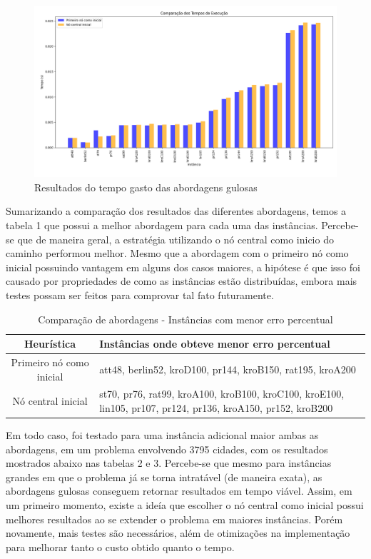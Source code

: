 \documentclass[10pt]{extarticle} %
\begin{document}
\begin{figure}[H]
    \centering
    \includegraphics[width=1\linewidth]{graficos_tempo.png}
    \caption{Resultados do tempo gasto das abordagens gulosas}
    \label{fig:Resultados abordagens gulosas}
\end{figure}

Sumarizando a comparação dos resultados das diferentes abordagens, temos a tabela 1 que possui a melhor abordagem para cada uma das instâncias. Percebe-se que de maneira geral, a estratégia utilizando o nó central como inicio do caminho performou melhor. Mesmo que a abordagem com o primeiro nó como inicial possuindo vantagem em alguns dos casos maiores, a hipótese é que isso foi causado por propriedades de como as instâncias estão distribuídas, embora mais testes possam ser feitos para comprovar tal fato futuramente. 

\begin{table}[H]
\centering
\begin{tabular}{|c|p{12cm}|} \hline
\textbf{Heurística}               & \textbf{Instâncias onde obteve menor erro percentual}          \\ \hline
Primeiro nó como inicial & att48, berlin52, kroD100, pr144, kroB150, rat195, kroA200 \\ \hline
Nó central inicial       & st70, pr76, rat99, kroA100, kroB100, kroC100, kroE100, \newline lin105, pr107, pr124, pr136, kroA150, pr152, kroB200 \\ \hline
\end{tabular}
\caption{Comparação de abordagens - Instâncias com menor erro percentual}
\label{tab:comparison_reformatted}
\end{table}

Em todo caso, foi testado para uma instância adicional maior ambas as abordagens, em um problema envolvendo 3795 cidades, com os resultados mostrados abaixo nas tabelas 2 e 3. Percebe-se que mesmo para instâncias grandes em que o problema já se torna intratável (de maneira exata), as abordagens gulosas conseguem retornar resultados em tempo viável. Assim, em um primeiro momento, existe a ideía que escolher o nó central como inicial possui melhores resultados ao se extender o problema em maiores instâncias. Porém novamente, mais testes são necessários, além de otimizações na implementação para melhorar tanto o custo obtido quanto o tempo.
\end{document}
